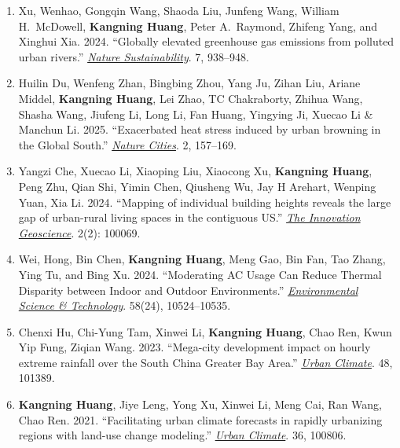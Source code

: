\documentclass[11pt,letterpaper]{article}
\begin{document}
\begin{enumerate}
  \item Xu, Wenhao, Gongqin Wang, Shaoda Liu, Junfeng Wang, William H.\ McDowell, \textbf{Kangning Huang}, Peter A.\ Raymond, Zhifeng Yang, and Xinghui Xia. 2024. ``Globally elevated greenhouse gas emissions from polluted urban rivers.'' \href{https://www.nature.com/articles/s41893-024-01358-y}{\textit{Nature Sustainability}}. 7, 938--948.

  \item Huilin Du, Wenfeng Zhan, Bingbing Zhou, Yang Ju, Zihan Liu, Ariane Middel, \textbf{Kangning Huang}, Lei Zhao, TC Chakraborty, Zhihua Wang, Shasha Wang, Jiufeng Li, Long Li, Fan Huang, Yingying Ji, Xuecao Li \& Manchun Li. 2025. ``Exacerbated heat stress induced by urban browning in the Global South.'' \href{https://doi.org/10.1038/s44284-024-00184-9}{\textit{Nature Cities}}. 2, 157--169.

  \item Yangzi Che, Xuecao Li, Xiaoping Liu, Xiaocong Xu, \textbf{Kangning Huang}, Peng Zhu, Qian Shi, Yimin Chen, Qiusheng Wu, Jay H Arehart, Wenping Yuan, Xia Li. 2024. ``Mapping of individual building heights reveals the large gap of urban-rural living spaces in the contiguous US.'' \href{https://www.the-innovation.org/article/doi/10.59717/j.xinn-geo.2024.100069}{\textit{The Innovation Geoscience}}. 2(2): 100069.

  \item Wei, Hong, Bin Chen, \textbf{Kangning Huang}, Meng Gao, Bin Fan, Tao Zhang, Ying Tu, and Bing Xu. 2024. ``Moderating AC Usage Can Reduce Thermal Disparity between Indoor and Outdoor Environments.'' \href{https://pubs.acs.org/doi/full/10.1021/acs.est.4c00424}{\textit{Environmental Science \& Technology}}. 58(24), 10524--10535.

  \item Chenxi Hu, Chi-Yung Tam, Xinwei Li, \textbf{Kangning Huang}, Chao Ren, Kwun Yip Fung, Ziqian Wang. 2023. ``Mega-city development impact on hourly extreme rainfall over the South China Greater Bay Area.'' \href{https://www.sciencedirect.com/science/article/pii/S2212095522003078}{\textit{Urban Climate}}. 48, 101389.

  \item \textbf{Kangning Huang}, Jiye Leng, Yong Xu, Xinwei Li, Meng Cai, Ran Wang, Chao Ren. 2021. ``Facilitating urban climate forecasts in rapidly urbanizing regions with land-use change modeling.'' \href{https://www.sciencedirect.com/science/article/pii/S2212095521000365}{\textit{Urban Climate}}. 36, 100806.


\end{enumerate}
\end{document}

